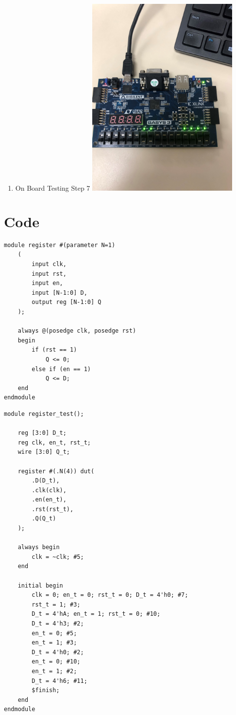 \documentclass[11pt]{article}
\begin{document}
\begin{enumerate}
\item On Board Testing Step 7 
\includegraphics[width=0.6\textwidth, angle=270]{Lab9.7.jpg} \centering
\label{fig:On Board testing Step 7}

\end{enumerate}

\section*{Code}

\begin{lstlisting}[style=Verilog,caption=register ,label=register.sv]
module register #(parameter N=1)
	(
		input clk,
		input rst,
		input en,
		input [N-1:0] D,
		output reg [N-1:0] Q
	);

	always @(posedge clk, posedge rst)
	begin 
		if (rst == 1)
			Q <= 0;
		else if (en == 1)
			Q <= D;
	end 
endmodule
\end{lstlisting}

\begin{lstlisting}[style=Verilog,caption=Register Test,label=register_test.sv]
module register_test();

	reg [3:0] D_t;
	reg clk, en_t, rst_t;
	wire [3:0] Q_t;

	register #(.N(4)) dut(
		.D(D_t),
		.clk(clk),
		.en(en_t),
		.rst(rst_t),
		.Q(Q_t)
	);

	always begin 
		clk = ~clk; #5;
	end

	initial begin
		clk = 0; en_t = 0; rst_t = 0; D_t = 4'h0; #7; 
		rst_t = 1; #3;
		D_t = 4'hA; en_t = 1; rst_t = 0; #10;
		D_t = 4'h3; #2;
		en_t = 0; #5;
		en_t = 1; #3;
		D_t = 4'h0; #2;
		en_t = 0; #10;
		en_t = 1; #2;
		D_t = 4'h6; #11;
		$finish;
	end 
endmodule
\end{lstlisting}
\end{document}

